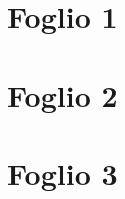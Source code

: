 \documentclass{article}
\begin{document}
\tableofcontents

\newpage

\section{Foglio 1}


\section{Foglio 2}


\section{Foglio 3}

\end{document}
